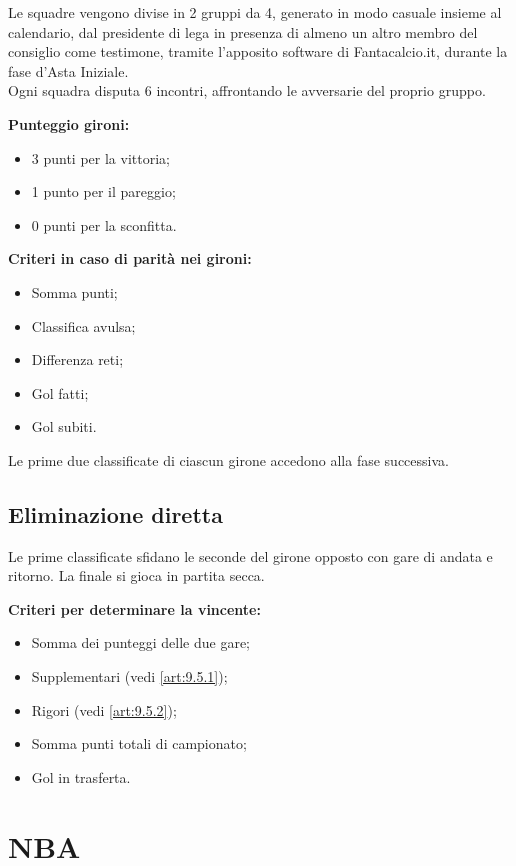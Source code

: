 Le squadre vengono divise in 2 gruppi da 4, generato in modo casuale insieme al calendario, dal presidente di lega in presenza di almeno un altro membro del consiglio come testimone, tramite l'apposito software di Fantacalcio.it, durante la fase d'Asta Iniziale.\\
Ogni squadra disputa 6 incontri, affrontando le avversarie del proprio gruppo.

\noindent \textbf{Punteggio gironi:}
\begin{itemize}
\item 3 punti per la vittoria;
\item 1 punto per il pareggio;
\item 0 punti per la sconfitta.
\end{itemize}

\noindent
\noindent \textbf{Criteri in caso di parità nei gironi:}
\begin{itemize}
\item Somma punti;
\item Classifica avulsa;
\item Differenza reti;
\item Gol fatti;
\item Gol subiti.
\end{itemize}

\noindent
Le prime due classificate di ciascun girone accedono alla fase successiva.

\subsection{Eliminazione diretta}
\label{art:9.2.2}

Le prime classificate sfidano le seconde del girone opposto con gare di andata e ritorno. La finale si gioca in partita secca.

\noindent \textbf{Criteri per determinare la vincente:}
\begin{itemize}
\item Somma dei punteggi delle due gare;
\item Supplementari (vedi \ref{art:9.5.1});
\item Rigori (vedi \ref{art:9.5.2});
\item Somma punti totali di campionato;
\item Gol in trasferta.
\end{itemize}

\section{NBA}
\label{art:9.3}

